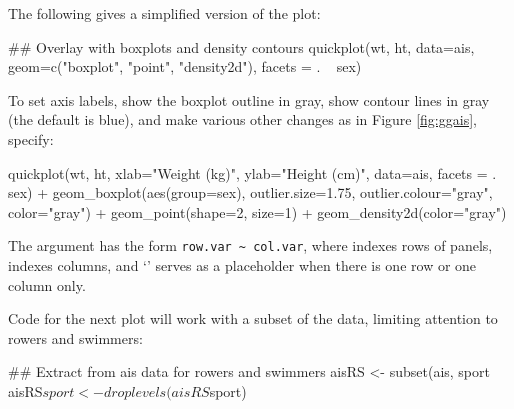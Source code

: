The following gives a simplified version of the plot:\vspace*{-3pt}
\begin{Schunk}
\begin{Sinput}
## Overlay with boxplots and density contours
quickplot(wt, ht, data=ais,
          geom=c("boxplot", "point", "density2d"),
          facets = . ~ sex)
\end{Sinput}
\end{Schunk}
To set axis labels, show the boxplot outline in gray, show contour
lines in gray (the default is blue), and make various other changes
as in Figure \ref{fig:ggais}, specify:\vspace*{-3pt}
\begin{Schunk}
\begin{Sinput}
quickplot(wt, ht, xlab="Weight (kg)",
          ylab="Height (cm)", data=ais,
          facets = . ~ sex) +
  geom_boxplot(aes(group=sex),
               outlier.size=1.75,
               outlier.colour="gray",
               color="gray") +
  geom_point(shape=2, size=1) +
  geom_density2d(color="gray")
\end{Sinput}
\end{Schunk}

The  argument has the form \verb!row.var ~ col.var!,
where  indexes rows of panels, 
indexes columns, and `' serves as a placeholder when there is
one row or one column only.

Code for the next plot will work with a subset of the 
data, limiting attention to rowers and swimmers:
\begin{Schunk}
\begin{Sinput}
## Extract from ais data for rowers and swimmers
aisRS <- subset(ais, sport %
aisRS$sport <- droplevels(aisRS$sport)
\end{Sinput}
\end{Schunk}

